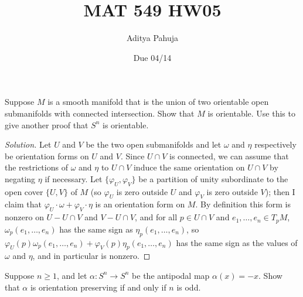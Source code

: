 \documentclass[10pt]{article}
\title{MAT 549 HW05}
\author{\large Aditya Pahuja}
\date{\large Due 04/14}
\newenvironment{soln}{\begin{proof}[Solution]}{\end{proof}}
\begin{document}
\maketitle

\begin{problem}
    [15-1]
    Suppose $M$ is a smooth manifold that is the union of
    two orientable open submanifolds with connected intersection.
    Show that $M$ is orientable.
    Use this to give another proof that $S^n$ is orientable.
\end{problem}

\begin{soln}
    Let $U$ and $V$ be the two open submanifolds
    and let $\omega$ and $\eta$ respectively
    be orientation forms on $U$ and $V$.
    Since $U\cap V$ is connected, we can assume that
    the restrictions of $\omega$ and $\eta$ to $U\cap V$
    induce the same orientation on $U\cap V$
    by negating $\eta$ if necessary.
    Let $\{\varphi_U,\varphi_V\}$ be a partition of unity
    subordinate to the open cover $\{U,V\}$ of $M$
    (so $\varphi_U$ is zero outside $U$
    and $\varphi_V$ is zero outside $V$); then I claim that
    $\varphi_U\cdot\omega + \varphi_V\cdot \eta$
    is an orientation form on $M$.
    By definition this form is nonzero
    on $U - U\cap V$ and $V - U\cap V$, and
    for all $p\in U\cap V$ and $e_1,\dots,e_n\in T_pM$,
    $\omega_p(e_1,\dots,e_n)$ has the same sign as $\eta_p(e_1,\dots,e_n)$,
    so $\varphi_U(p)\omega_p(e_1,\dots,e_n) +
    \varphi_V(p)\eta_p(e_1,\dots,e_n)$
    has the same sign as the values of $\omega$ and $\eta$,
    and in particular is nonzero.
\end{soln}

\begin{problem}
    [15-3]
    Suppose $n\ge 1$, and let $\alpha\colon S^n\to S^n$
    be the antipodal map $\alpha(x) = -x$.
    Show that $\alpha$ is orientation preserving
    if and only if $n$ is odd.
\end{problem}
\end{document}
